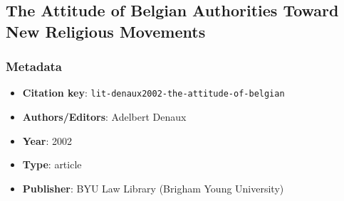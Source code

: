 \subsection{The Attitude of Belgian Authorities Toward New Religious Movements}\label{lit:lit-denaux2002-the-attitude-of-belgian}
\subsubsection*{Metadata}
\begin{itemize}
  \item \textbf{Citation key}: \texttt{lit-denaux2002-the-attitude-of-belgian}
  \item \textbf{Authors/Editors}: Adelbert Denaux
  \item \textbf{Year}: 2002
  \item \textbf{Type}: article
  \item \textbf{Publisher}: BYU Law Library (Brigham Young University)
\end{itemize}
